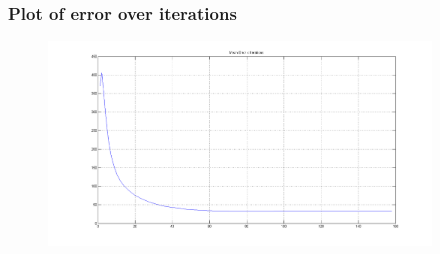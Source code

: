 \documentclass{beamer}
\begin{document}
\begin{frame}
\frametitle{Plot of error over iterations}

\begin{figure}[H]
\centering
\includegraphics[width=4in]{figures/03-MeanErrorPlot.png}
\end{figure}

\end{frame}
\end{document}
